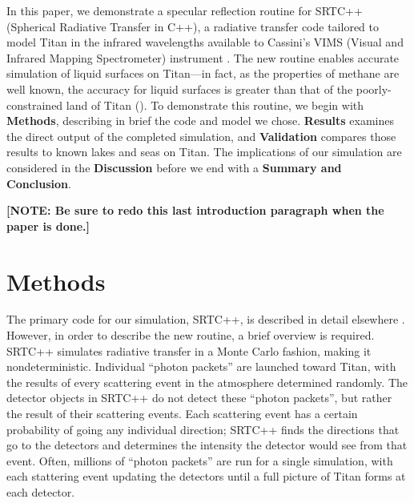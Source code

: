 \documentclass[twocolumn,linenumbers]{aastex631}
\begin{document}
In this paper, we demonstrate a specular reflection routine for SRTC++ (Spherical Radiative Transfer in C++), a radiative transfer code tailored to model Titan in the infrared wavelengths available to Cassini's VIMS (Visual and Infrared Mapping Spectrometer) instrument \citep{Barnes2018}. The new routine enables accurate simulation of liquid surfaces on Titan---in fact, as the properties of methane are well known, the accuracy for liquid surfaces is greater than that of the poorly-constrained land of Titan (). To demonstrate this routine, we begin with \textbf{Methods}, describing in brief the code and model we chose. \textbf{Results} examines the direct output of the completed simulation, and \textbf{Validation} compares those results to known lakes and seas on Titan. The implications of our simulation are considered in the \textbf{Discussion} before we end with a \textbf{Summary and Conclusion}.

\textbf{\color{red} [NOTE: Be sure to redo this last introduction paragraph when the paper is done.] \color{black}}

\section{Methods} \label{sec:methods}

The primary code for our simulation, SRTC++, is described in detail elsewhere \citep{Barnes2018}. However, in order to describe the new routine, a brief overview is required. SRTC++ simulates radiative transfer in a Monte Carlo fashion, making it nondeterministic. Individual ``photon packets'' are launched toward Titan, with the results of every scattering event in the atmosphere determined randomly. The detector objects in SRTC++ do not detect these ``photon packets'', but rather the result of their scattering events. Each scattering event has a certain probability of going any individual direction; SRTC++ finds the directions that go to the detectors and determines the intensity the detector would see from that event. Often, millions of ``photon packets'' are run for a single simulation, with each stattering event updating the detectors until a full picture of Titan forms at each detector.
\end{document}
